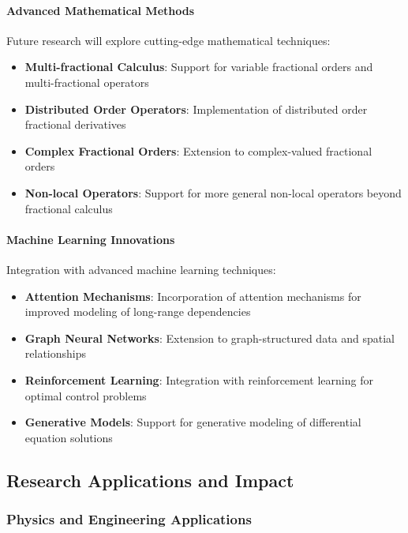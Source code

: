 \paragraph{Advanced Mathematical Methods}
Future research will explore cutting-edge mathematical techniques:

\begin{itemize}
    \item \textbf{Multi-fractional Calculus}: Support for variable fractional orders and multi-fractional operators
    \item \textbf{Distributed Order Operators}: Implementation of distributed order fractional derivatives
    \item \textbf{Complex Fractional Orders}: Extension to complex-valued fractional orders
    \item \textbf{Non-local Operators}: Support for more general non-local operators beyond fractional calculus
\end{itemize}

\paragraph{Machine Learning Innovations}
Integration with advanced machine learning techniques:

\begin{itemize}
    \item \textbf{Attention Mechanisms}: Incorporation of attention mechanisms for improved modeling of long-range dependencies
    \item \textbf{Graph Neural Networks}: Extension to graph-structured data and spatial relationships
    \item \textbf{Reinforcement Learning}: Integration with reinforcement learning for optimal control problems
    \item \textbf{Generative Models}: Support for generative modeling of differential equation solutions
\end{itemize}

\subsection{Research Applications and Impact}

\subsubsection{Physics and Engineering Applications}

